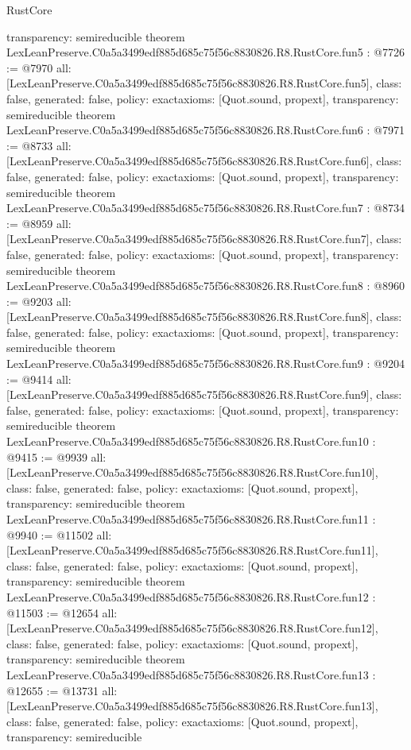 \begin{lexlean}{RustCore}
\begin{coremodule}
{  transparency: semireducible
}
theorem LexLeanPreserve.C0a5a3499edf885d685c75f56c8830826.R8.RustCore.fun5 : @7726 := @7970 {
  all: [LexLeanPreserve.C0a5a3499edf885d685c75f56c8830826.R8.RustCore.fun5],
  class: false,
  generated: false,
  policy: exact{axioms: [Quot.sound, propext]},
  transparency: semireducible
}
theorem LexLeanPreserve.C0a5a3499edf885d685c75f56c8830826.R8.RustCore.fun6 : @7971 := @8733 {
  all: [LexLeanPreserve.C0a5a3499edf885d685c75f56c8830826.R8.RustCore.fun6],
  class: false,
  generated: false,
  policy: exact{axioms: [Quot.sound, propext]},
  transparency: semireducible
}
theorem LexLeanPreserve.C0a5a3499edf885d685c75f56c8830826.R8.RustCore.fun7 : @8734 := @8959 {
  all: [LexLeanPreserve.C0a5a3499edf885d685c75f56c8830826.R8.RustCore.fun7],
  class: false,
  generated: false,
  policy: exact{axioms: [Quot.sound, propext]},
  transparency: semireducible
}
theorem LexLeanPreserve.C0a5a3499edf885d685c75f56c8830826.R8.RustCore.fun8 : @8960 := @9203 {
  all: [LexLeanPreserve.C0a5a3499edf885d685c75f56c8830826.R8.RustCore.fun8],
  class: false,
  generated: false,
  policy: exact{axioms: [Quot.sound, propext]},
  transparency: semireducible
}
theorem LexLeanPreserve.C0a5a3499edf885d685c75f56c8830826.R8.RustCore.fun9 : @9204 := @9414 {
  all: [LexLeanPreserve.C0a5a3499edf885d685c75f56c8830826.R8.RustCore.fun9],
  class: false,
  generated: false,
  policy: exact{axioms: [Quot.sound, propext]},
  transparency: semireducible
}
theorem LexLeanPreserve.C0a5a3499edf885d685c75f56c8830826.R8.RustCore.fun10 : @9415 := @9939 {
  all: [LexLeanPreserve.C0a5a3499edf885d685c75f56c8830826.R8.RustCore.fun10],
  class: false,
  generated: false,
  policy: exact{axioms: [Quot.sound, propext]},
  transparency: semireducible
}
theorem LexLeanPreserve.C0a5a3499edf885d685c75f56c8830826.R8.RustCore.fun11 : @9940 := @11502 {
  all: [LexLeanPreserve.C0a5a3499edf885d685c75f56c8830826.R8.RustCore.fun11],
  class: false,
  generated: false,
  policy: exact{axioms: [Quot.sound, propext]},
  transparency: semireducible
}
theorem LexLeanPreserve.C0a5a3499edf885d685c75f56c8830826.R8.RustCore.fun12 : @11503 := @12654 {
  all: [LexLeanPreserve.C0a5a3499edf885d685c75f56c8830826.R8.RustCore.fun12],
  class: false,
  generated: false,
  policy: exact{axioms: [Quot.sound, propext]},
  transparency: semireducible
}
theorem LexLeanPreserve.C0a5a3499edf885d685c75f56c8830826.R8.RustCore.fun13 : @12655 := @13731 {
  all: [LexLeanPreserve.C0a5a3499edf885d685c75f56c8830826.R8.RustCore.fun13],
  class: false,
  generated: false,
  policy: exact{axioms: [Quot.sound, propext]},
  transparency: semireducible
}
\end{coremodule}
\end{lexlean}
